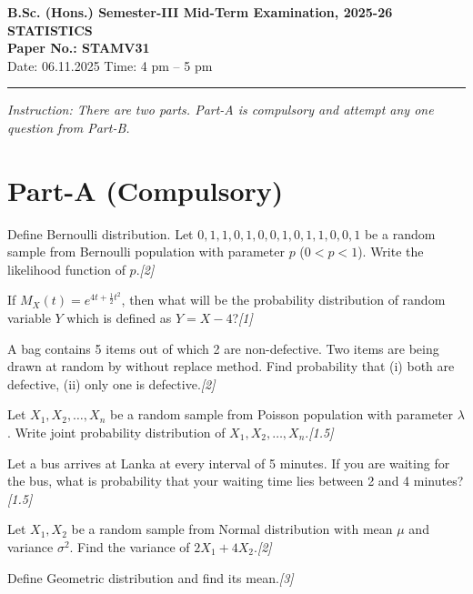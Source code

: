 \documentclass[11pt,a4paper]{article}
\newcommand{\pts}[1]{\hfill   \textit{[#1]}}
\begin{document}
\begin{center}
  {\large\bfseries B.Sc. (Hons.) Semester-III Mid-Term Examination, 2025-26}\\[4pt]
  {\large\bfseries STATISTICS}\\[4pt]
  {\large\bfseries Paper No.: STAMV31}\\[4pt]
  {\normalsize Date: 06.11.2025 \hfill Time: 4 pm -- 5 pm}
\end{center}

\rule{\linewidth}{0.4pt}\smallskip



\noindent   \textit{Instruction: There are two parts. Part-A is compulsory and attempt any one question from Part-B.}
\bigskip

\section*{Part-A (Compulsory)}


\begin{parts}
  \item Define Bernoulli distribution. Let $0, 1, 1, 0, 1, 0, 0, 1, 0, 1, 1, 0, 0, 1$ be a random sample from Bernoulli population with parameter $p$ ($0 < p < 1$). Write the likelihood function of $p$.\pts{2}

  \item If $M_X(t) = e^{4t + \frac{1}{2}t^2}$, then what will be the probability distribution of random variable $Y$ which is defined as $Y = X - 4$?\pts{1}

  \item A bag contains 5 items out of which 2 are non-defective. Two items are being drawn at random by without replace method. Find probability that (i) both are defective, (ii) only one is defective.\pts{2}

  \item Let $X_1, X_2, \dots, X_n$ be a random sample from Poisson population with parameter $\lambda$. Write joint probability distribution of $X_1, X_2, \dots, X_n$.\pts{1.5}

  \item Let a bus arrives at Lanka at every interval of 5 minutes. If you are waiting for the bus, what is probability that your waiting time lies between 2 and 4 minutes?\pts{1.5}

  \item Let $X_1, X_2$ be a random sample from Normal distribution with mean $\mu$ and variance $\sigma^2$. Find the variance of $2X_1 + 4X_2$.\pts{2}

  \item Define Geometric distribution and find its mean.\pts{3}
\end{parts}
\end{document}
